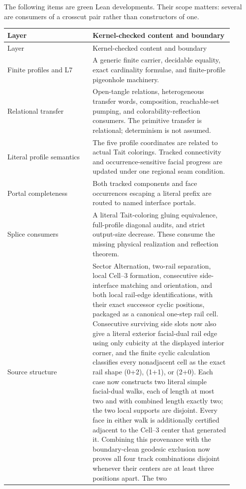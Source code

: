 \documentclass[11pt]{article}
\theoremstyle{definition}
\begin{document}
The following items are green Lean developments.  Their scope matters: several
are consumers of a crosscut pair rather than constructors of one.

\begingroup
\small
\begin{longtable}{@{}p{0.34\linewidth}p{0.57\linewidth}@{}}
\toprule
Layer & Kernel-checked content and boundary \\
\midrule
\endfirsthead
\toprule
Layer & Kernel-checked content and boundary \\
\midrule
\endhead
Finite profiles and L7 & A generic finite carrier, decidable equality, exact
cardinality formulae, and finite-profile pigeonhole machinery. \\
Relational transfer & Open-tangle relations, heterogeneous transfer words,
composition, reachable-set pumping, and colorability-reflection consumers.
The primitive transfer is relational; determinism is not assumed. \\
Literal profile semantics & The five profile coordinates are related to actual
Tait colorings.  Tracked connectivity and occurrence-sensitive facial progress
are updated under one regional seam condition. \\
Portal completeness & Both tracked components and face occurrences escaping a
literal prefix are routed to named interface portals. \\
Splice consumers & A literal Tait-coloring gluing equivalence, full-profile
diagonal audits, and strict output-size decrease.  These consume the missing
physical realization and reflection theorem. \\
Source structure & Sector Alternation, two-rail separation, local Cell--3
formation, consecutive side-interface matching and orientation, and both
local rail-edge identifications, with their exact successor cyclic positions,
packaged as a canonical one-step rail cell.  Consecutive surviving side slots
now also give a literal exterior facial-dual rail edge using only cubicity at
the displayed interior corner, and the finite cyclic calculation classifies
every nonadjacent cell as the exact rail shape (0+2), (1+1), or (2+0).
Each case now constructs two literal simple facial-dual walks, each of length
at most two and with combined length exactly two; the two local supports are
disjoint.  Every face in either walk is additionally certified adjacent to
the Cell--3 center that generated it.  Combining this provenance with the
boundary-clean geodesic exclusion now proves all four track combinations
disjoint whenever their centers are at least three positions apart.  The two

\end{longtable}
\end{document}

